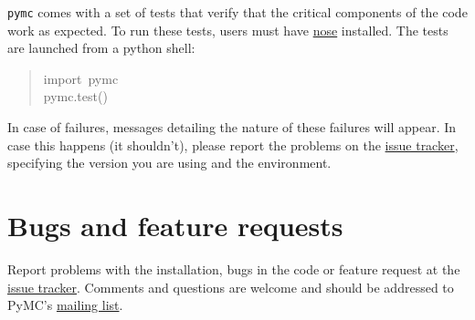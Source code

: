 \texttt{pymc} comes with a set of tests that verify that the critical components
of the code work as expected. To run these tests, users must have \href{http://somethingaboutorange.com/mrl/projects/nose/}{nose}
installed. The tests are launched from a python shell:
\begin{quote}{\ttfamily \raggedright \noindent
import~pymc~\\
pymc.test()
}\end{quote}

In case of failures, messages detailing the nature of these failures will
appear. In case this happens (it shouldn't), please report
the problems on the \href{http://code.google.com/p/pymc/issues/list.}{issue tracker}, specifying the version you are using and
the environment.



\hypertarget{bugs-and-feature-requests}{}
\section{Bugs and feature requests}
\label{bugs-and-feature-requests}

Report problems with the installation, bugs in the code or feature request at
the \href{http://code.google.com/p/pymc/issues/list.}{issue tracker}. Comments and questions are welcome and should be
addressed to PyMC's \href{mailto:pymc-users@fisher.forestry.uga.edu}{mailing list}.

